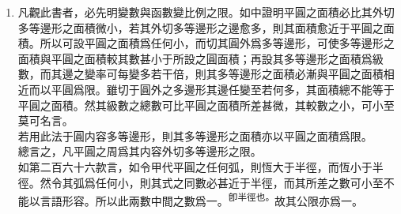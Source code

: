 \begin{enumerate} [label={第\chinese*款}]
	\textsuperscript{\textbf{整理者註：}右最後一句云\textit{戌變爲天之陰函數}，這顯而易見是錯誤的。原文卷第九之Fluxions作explicit function，}\\\textsuperscript{卽陽函數，此當爲譯者譯錯。目前由於校勘凡例未定，暫留此字，待討論後決定修改與否。}\\
	昔代數之家，凡遇須用開平方之處，每于其式之左旁作一根字以記之，如\CJKmove 爲天之平方根。後又變通其法，而以根號記之，如\CJKmove 爲天之平方根。此代數之例也。茲可仿照此例，凡遇某變數之函數，亦用一號以記之。所以凡有任何變數之函數，皆可書一函字于其變數之旁，以爲識別。\\
	如天之函數則作\CJKmove ，或作\CJKmove ，皆言天之函數也。\\
	所以凡見變數之左旁有一函字者，其函字並非代表天之倍數，其意謂是某變數之函數也。\\
	用此法則可將\CJKmove 各種之式以一語賅之，謂之\CJKmove 或\CJKmove 。\\
	若函數從兩箇變數而成，其天與地皆爲自主之變數，其式如\CJKmove 者，則可以\CJKmove 別之。函數爲多箇變數所成者，仿此推之。\\
	惟函數只指其變數言之，若甲乙丙丁各常數。雖多不論。
	\item 凡觀此書者，必先明變數與函數變比例之限。如中證明平圓之面積必比其外切多等邊形之面積微小，若其外切多等邊形之邊愈多，則其面積愈近于平圓之面積。所以可設平圓之面積爲任何小，而切其圓外爲多等邊形，可使多等邊形之面積與平圓之面積較其數甚小于所設之圓面積；再設其多等邊形之面積爲級數，而其邊之變率可每變多若干倍，則其多等邊形之面積必漸與平圓之面積相近而以平圓爲限。雖切于圓外之多邊形其邊任變至若何多，其面積總不能等于平圓之面積。然其級數之總數可比平圓之面積所差甚微，其較數之小，可小至莫可名言。\\
	若用此法于圓内容多等邊形，則其多等邊形之面積亦以平圓之面積爲限。\\
	總言之，凡平圓之周爲其内容外切多等邊形之限。\\
	如第二百六十六款言，如令甲代平圓之任何弧，則\CJKmove 恆大于半徑，而\CJKmove 恆小于半徑。然令其弧爲任何小，則其式之同數必甚近于半徑，而其所差之數可小至不能以言語形容。所以此兩數中間之數爲一。\textsuperscript{卽半徑也。}故其公限亦爲一。\\

\end{enumerate}
